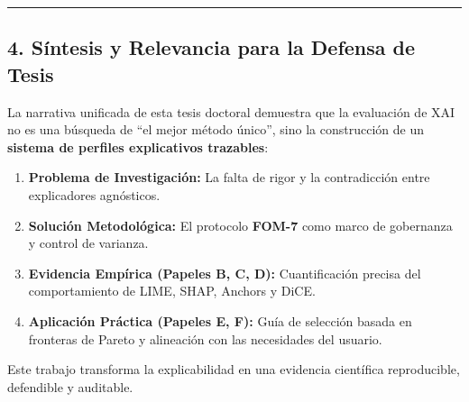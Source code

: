 \documentclass[
]{article}
\providecommand{\tightlist}{%
  \setlength{\itemsep}{0pt}\setlength{\parskip}{0pt}}
\begin{document}
\begin{center}\rule{0.5\linewidth}{0.5pt}\end{center}

\subsection{4. Síntesis y Relevancia para la Defensa de
Tesis}\label{suxedntesis-y-relevancia-para-la-defensa-de-tesis}

La narrativa unificada de esta tesis doctoral demuestra que la
evaluación de XAI no es una búsqueda de ``el mejor método único'', sino
la construcción de un \textbf{sistema de perfiles explicativos
trazables}:

\begin{enumerate}
\def\labelenumi{\arabic{enumi}.}
\tightlist
\item
  \textbf{Problema de Investigación:} La falta de rigor y la
  contradicción entre explicadores agnósticos.
\item
  \textbf{Solución Metodológica:} El protocolo \textbf{FOM-7} como marco
  de gobernanza y control de varianza.
\item
  \textbf{Evidencia Empírica (Papeles B, C, D):} Cuantificación precisa
  del comportamiento de LIME, SHAP, Anchors y DiCE.
\item
  \textbf{Aplicación Práctica (Papeles E, F):} Guía de selección basada
  en fronteras de Pareto y alineación con las necesidades del usuario.
\end{enumerate}

Este trabajo transforma la explicabilidad en una evidencia científica
reproducible, defendible y auditable.
\end{document}

